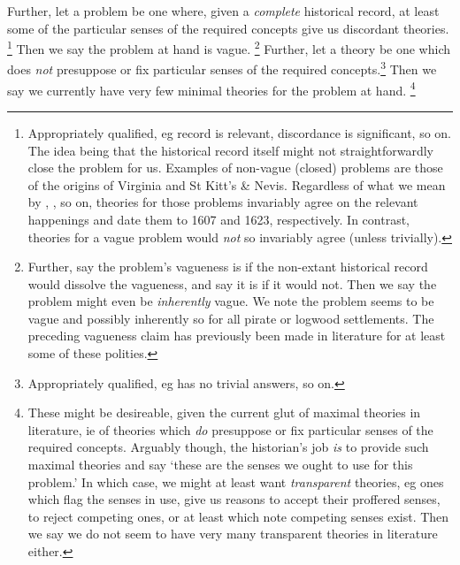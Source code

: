 		Further, let a  problem be one where, given a \emph{complete} historical record, at least some of the particular senses of the required concepts give us discordant theories.%
		\footnote{Appropriately qualified, eg record is relevant, discordance is significant, so on. The idea being that the historical record itself might not straightforwardly close the problem for us. Examples of non-vague (closed) problems are those of the origins of Virginia and St Kitt's \& Nevis. Regardless of what we mean by , , so on, theories for those problems invariably agree on the relevant happenings and date them to 1607 and 1623, respectively. In contrast, theories for a vague problem would \emph{not} so invariably agree (unless trivially).}
		Then we say the problem at hand is vague.%
		\footnote{Further, say the problem's vagueness is  if the non-extant historical record would dissolve the vagueness, and say it is  if it would not. Then we say the problem might even be \emph{inherently} vague. We note the problem seems to be vague and possibly inherently so for all pirate or logwood settlements. The preceding vagueness claim has previously been made in literature for at least some of these polities.}
		Further, let a  theory be one which does \emph{not} presuppose or fix particular senses of the required concepts.\footnote{Appropriately qualified, eg has no trivial answers, so on.} Then we say we currently have very few minimal theories for the problem at hand.%
		\footnote{These might be desireable, given the current glut of maximal theories in literature, ie of theories which \emph{do} presuppose or fix particular senses of the required concepts. Arguably though, the historian's job \emph{is} to provide such maximal theories and say `these are the senses we ought to use for this problem.' In which case, we might at least want \emph{transparent} theories, eg ones which flag the senses in use, give us reasons to accept their proffered senses, to reject competing ones, or at least which note competing senses exist. Then we say we do not seem to have very many transparent theories in literature either.} %
%
%
%
